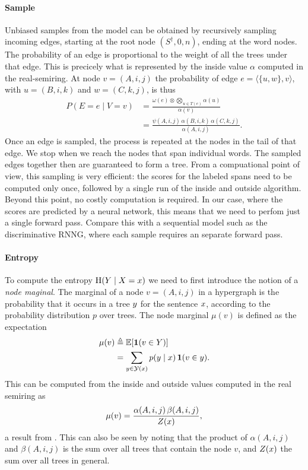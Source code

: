     \paragraph{Sample}
      Unbiased samples from the model can be obtained by recursively sampling incoming edges, starting at the root node $(S^{\dagger}, 0, n)$, ending at the word nodes. The probability of an edge is proportional to the weight of all the trees under that edge. This is precicely what is represented by the inside value $\alpha$ computed in the real-semiring. At node $v = (A, i, j)$ the probability of edge $e = \langle \{ u, w \}, v \rangle$, with $u = (B, i, k)$ and $w = (C, k, j)$, is thus
      \begin{align}
        \label{eq:sample}
        P(E = e \mid V = v)
          &= \frac{\omega(e) \otimes \bigotimes_{u \in T(e)} \alpha(u)}{\alpha(v)}  \nonumber  \\
          &= \frac{\psi(A, i, j) \, \alpha(B, i, k) \, \alpha(C, k, j)}{\alpha(A, i, j)}.
      \end{align}
      Once an edge is sampled, the process is repeated at the nodes in the tail of that edge. We stop when we reach the nodes that span individual words. The sampled edges together then are guaranteed to form a tree. From a compuational point of view, this sampling is very efficient: the scores for the labeled spans need to be computed only once, followed by a single run of the inside and outside algorithm. Beyond this point, no costly computation is required. In our case, where the scores are predicted by a neural network, this means that we need to perfom just a single forward pass. Compare this with a sequential model such as the discriminative RNNG, where each sample requires an separate forward pass.

    \paragraph{Entropy}
      To compute the entropy $\operatorname{H}(Y \mid X = x)$ we need to first introduce the notion of a \textit{node maginal}. The marginal of a node $v = (A, i, j)$ in a hypergraph is the probability that it occurs in a tree $y$ for the sentence $x$, according to the probability distribution $p$ over trees. The node marginal $\mu(v)$ is defined as the expectation
      \begin{align}
        \label{eq:node-marginal}
        \mu(v)
          &\triangleq \operatorname{\mathbb{E}}[ \operatorname{\mathbf{1}}( v \in Y ) ]  \nonumber \\
          &= \sum_{ y \in \mathcal{Y}(x) } p(y \mid x) \operatorname{\mathbf{1}}( v \in y ).
      \end{align}
      This can be computed from the inside and outside values computed in the real semiring as
      \begin{align}
        \mu(v) = \frac{\alpha(A, i, j) \, \beta(A, i, j)}{Z(x)},
      \end{align}
      a result from \citep{goodman1999semiring}. This can also be seen by noting that the product of $\alpha(A, i, j)$ and $\beta(A, i, j)$ is the sum over all trees that contain the node $v$, and $Z(x)$ the sum over all trees in general.

